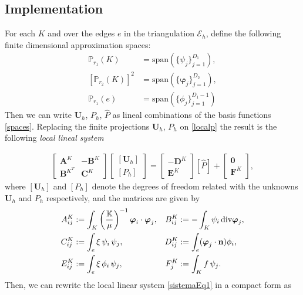 \documentclass[review]{elsarticle}
\def\dd{{\rm div}}
\def\nn{\textbf{n}}
\def\unn{\textbf{U}}
\def\vphinn{\boldsymbol{\varphi}}
\def\esq{\mathcal{E}}
\begin{document}
\subsection{Implementation}

For each $K$ and over the edges $e$ in the triangulation $\esq_h$, define the following finite dimensional approximation spaces:
\begin{equation}\label{spaces}
\begin{aligned}
\mathbb{P}_{r_1}(K)   &  = \mathrm{span}\left( \{\psi_j\}_{j=1}^{D_1}\right) , \\
[\mathbb{P}_{r_2}(K)]^2 & = \mathrm{span}\left( \{\vphinn_j\}_{j=1}^{D_2}\right)  ,  \\
\mathbb{P}_{r_1}(e) & =  \mathrm{span}\left( \{\phi_j\}_{j=1}^{D_1-1} \right) 
\end{aligned}
\end{equation}
Then we can write $\unn_h$, $P_h$, $\hat{P}$ as lineal combinations of the basis functions \eqref{spaces}. Replacing the finite projections  $\unn_h$, $P_h$ on \eqref{localp} the result is the following \textit{local lineal system}

\begin{align}\label{sistemaEq1}
\left[\begin{array}{cc}
\textbf{A}^K & -\textbf{B}^K \\ 
\textbf{B}^{K^T} & \textbf{C}^K
\end{array} \right] 
\left[\begin{array}{c}
\left[\unn_h \right] \\ 
\left[ P_h \right]
\end{array} \right]  = 
\left[\begin{array}{c}
- \textbf{D}^K  \\ 
\textbf{E}^K 
\end{array} \right] 
[\hat{P}] + 
\left[\begin{array}{c}
\textbf{0}  \\ 
\textbf{F}^K 
\end{array} \right],
\end{align}
where $\left[\unn_h \right]$ and $\left[ P_h \right]$ denote the degrees of freedom related with the unknowns $\unn_h$ and $P_h$ respectively, and the matrices are given by
\begin{equation} 
\begin{aligned} \label{matrices}
A_{ij}^K &:=  \int_K \left( \frac{\mathbb{K}}{\mu} \right) ^{-1} \vphinn_i \cdot \vphinn_j ,
& B_{ij}^K &:=   - \int_K   \psi_i \, \dd\vphinn_j ,  \\
C_{ij}^K &:=\int_{e} \xi\, \psi_i\,\psi_j ,
& D_{ij}^K &:= \int_{e}(\vphinn_j\cdot\nn)\phi_i,\\  
E_{ij}^K &:= \int_{e} \xi\,\phi_i\,\psi_j,
& F_{j}^K  &:=  \int_K f\,\psi_j.
\end{aligned}
\end{equation}
Then, we can rewrite the local linear system \eqref{sistemaEq1} in a compact form as 
\end{document}
